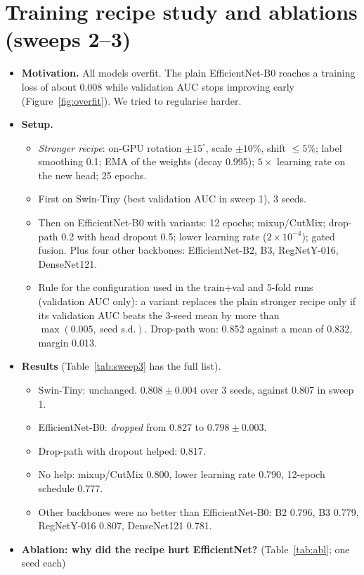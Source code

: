 \documentclass[11pt]{article}
\begin{document}
\section{Training recipe study and ablations (sweeps 2--3)}\label{app:recipe}
\begin{itemize}
\item \textbf{Motivation.} All models overfit. The plain EfficientNet-B0 reaches a training loss of about 0.008 while validation AUC stops improving early (Figure~\ref{fig:overfit}). We tried to regularise harder.
\item \textbf{Setup.}
  \begin{itemize}
  \item \emph{Stronger recipe}: on-GPU rotation $\pm15^\circ$, scale $\pm10\%$, shift $\le5\%$; label smoothing 0.1; EMA of the weights (decay 0.995); $5\times$ learning rate on the new head; 25 epochs.
  \item First on Swin-Tiny (best validation AUC in sweep 1), 3 seeds.
  \item Then on EfficientNet-B0 with variants: 12 epochs; mixup/CutMix; drop-path 0.2 with head dropout 0.5; lower learning rate ($2\times10^{-4}$); gated fusion. Plus four other backbones: EfficientNet-B2, B3, RegNetY-016, DenseNet121.
  \item Rule for the configuration used in the train+val and 5-fold runs (validation AUC only): a variant replaces the plain stronger recipe only if its validation AUC beats the 3-seed mean by more than $\max(0.005,\ \text{seed s.d.})$. Drop-path won: 0.852 against a mean of 0.832, margin 0.013.
  \end{itemize}
\item \textbf{Results} (Table~\ref{tab:sweep3} has the full list).
  \begin{itemize}
  \item Swin-Tiny: unchanged. $0.808\pm0.004$ over 3 seeds, against 0.807 in sweep 1.
  \item EfficientNet-B0: \emph{dropped} from 0.827 to $0.798\pm0.003$.
  \item Drop-path with dropout helped: 0.817.
  \item No help: mixup/CutMix 0.800, lower learning rate 0.790, 12-epoch schedule 0.777.
  \item Other backbones were no better than EfficientNet-B0: B2 0.796, B3 0.779, RegNetY-016 0.807, DenseNet121 0.781.
  \end{itemize}
\item \textbf{Ablation: why did the recipe hurt EfficientNet?} (Table~\ref{tab:abl}; one seed each)

\end{itemize}
\end{document}
